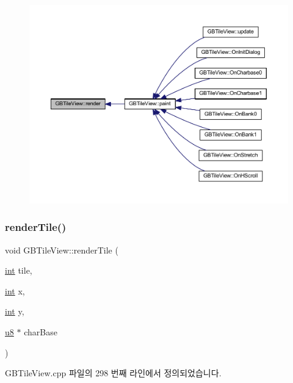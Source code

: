 \nopagebreak
\begin{figure}[H]
\begin{center}
\leavevmode
\includegraphics[width=350pt]{class_g_b_tile_view_a1012b77fed7304d7b27b9d619472e6a7_icgraph}
\end{center}
\end{figure}
\mbox{\label{class_g_b_tile_view_ade04081b3b047c110f6ae5673c7154ee}} 
\subsubsection{\texorpdfstring{render\+Tile()}{renderTile()}}
{\footnotesize\ttfamily void G\+B\+Tile\+View\+::render\+Tile (\begin{DoxyParamCaption}\item[{\mbox{\hyperlink{_util_8cpp_a0ef32aa8672df19503a49fab2d0c8071}{int}}}]{tile,  }\item[{\mbox{\hyperlink{_util_8cpp_a0ef32aa8672df19503a49fab2d0c8071}{int}}}]{x,  }\item[{\mbox{\hyperlink{_util_8cpp_a0ef32aa8672df19503a49fab2d0c8071}{int}}}]{y,  }\item[{\mbox{\hyperlink{_system_8h_aed742c436da53c1080638ce6ef7d13de}{u8}} $\ast$}]{char\+Base }\end{DoxyParamCaption})}



G\+B\+Tile\+View.\+cpp 파일의 298 번째 라인에서 정의되었습니다.


